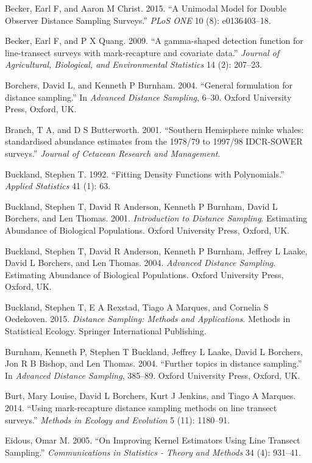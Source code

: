 \documentclass[article]{jss}
\begin{document}
Becker, Earl F, and Aaron M Christ. 2015. ``A Unimodal Model for Double
Observer Distance Sampling Surveys.'' \emph{PLoS ONE} 10 (8):
e0136403--18.

Becker, Earl F, and P X Quang. 2009. ``A gamma-shaped detection function
for line-transect surveys with mark-recapture and covariate data.''
\emph{Journal of Agricultural, Biological, and Environmental Statistics}
14 (2): 207--23.

Borchers, David L, and Kenneth P Burnham. 2004. ``General formulation
for distance sampling.'' In \emph{Advanced Distance Sampling}, 6--30.
Oxford University Press, Oxford, UK.

Branch, T A, and D S Butterworth. 2001. ``Southern Hemisphere minke
whales: standardised abundance estimates from the 1978/79 to 1997/98
IDCR-SOWER surveys.'' \emph{Journal of Cetacean Research and
Management}.

Buckland, Stephen T. 1992. ``Fitting Density Functions with
Polynomials.'' \emph{Applied Statistics} 41 (1): 63.

Buckland, Stephen T, David R Anderson, Kenneth P Burnham, David L
Borchers, and Len Thomas. 2001. \emph{Introduction to Distance
Sampling}. Estimating Abundance of Biological Populations. Oxford
University Press, Oxford, UK.

Buckland, Stephen T, David R Anderson, Kenneth P Burnham, Jeffrey L
Laake, David L Borchers, and Len Thomas. 2004. \emph{Advanced Distance
Sampling}. Estimating Abundance of Biological Populations. Oxford
University Press, Oxford, UK.

Buckland, Stephen T, E A Rexstad, Tiago A Marques, and Cornelia S
Oedekoven. 2015. \emph{Distance Sampling: Methods and Applications}.
Methods in Statistical Ecology. Springer International Publishing.

Burnham, Kenneth P, Stephen T Buckland, Jeffrey L Laake, David L
Borchers, Jon R B Bishop, and Len Thomas. 2004. ``Further topics in
distance sampling.'' In \emph{Advanced Distance Sampling}, 385--89.
Oxford University Press, Oxford, UK.

Burt, Mary Louise, David L Borchers, Kurt J Jenkins, and Tiago A
Marques. 2014. ``Using mark-recapture distance sampling methods on line
transect surveys.'' \emph{Methods in Ecology and Evolution} 5 (11):
1180--91.

Eidous, Omar M. 2005. ``On Improving Kernel Estimators Using Line
Transect Sampling.'' \emph{Communications in Statistics - Theory and
Methods} 34 (4): 931--41.
\end{document}
